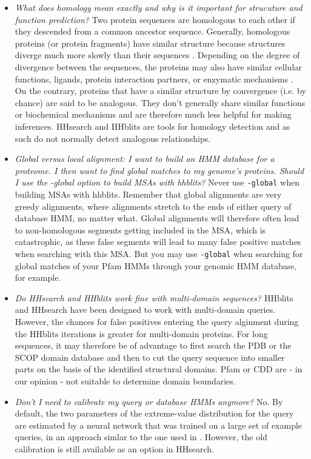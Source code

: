 \documentclass[11pt,a4paper]{article}
\begin{document}
\begin{itemize}
\item \emph{What does homology mean exactly and why is it important for strucuture and function prediction?}
Two protein sequences are homologous to each other if they descended from a common ancestor sequence. Generally, homologous proteins (or protein fragments) have similar structure because structures diverge much more slowly than their sequences \cite{Chothia:1986}. Depending on the degree of divergence between the sequences, the proteins may also have similar cellular functions, ligands, protein interaction partners, or enzymatic mechanisms \cite{Todd:2001}. On the contrary, proteins that have a similar structure by convergence (i.e. by chance) are said to be analogous. They don't generally share similar functions or biochemical mechanisms and are therefore much less helpful for making inferences. HHsearch and HHblits are tools for homology detection and as such do not normally detect analogous relationships.

\item \emph{Global versus local alignment: I want to build an HMM database for a proteome. I then want to find global matches to my genome's proteins. Should I use the -global option to build MSAs with  hhblits?} 
Never use \verb`-global` when building MSAs with hhblits. Remember that global alignments are very greedy alignments, where alignments stretch to the ends of either query of database HMM, no matter what. Global alignments will therefore often lead to non-homologous segments getting included in the MSA, which is catastrophic, as these false segments will lead to many false positive matches when searching with this MSA. But you may use \verb`-global` when searching for global matches of your Pfam HMMs through your genomic HMM database, for example.

\item \emph{Do HHsearch and HHblits work fine with multi-domain sequences?}
HHblits and HHsearch have been designed to work with multi-domain queries. However, the chances for false positives entering the query alginment during the HHblits iterations is greater for multi-domain proteins. For long sequences, it may therefore be of advantage to first search the PDB or the SCOP domain database and then to cut the query sequence into smaller parts on the basis of the identified structural domains. Pfam or CDD are - in our opinion - not suitable to determine domain boundaries.

\item \emph{Don't I need to calibrate my query or database HMMs anymore?}
No. By default, the two parameters of the extreme-value distribution for the query are estimated by a neural network that was trained on a large set of example queries, in an approach simlar to the one used in \cite{Sadreyev:2008}. However, the old calibration is still available as an option in HHsearch.


\end{itemize}
\end{document}
